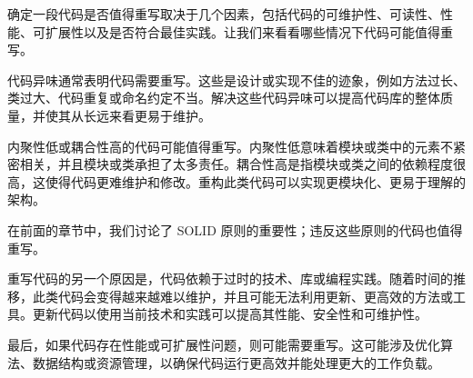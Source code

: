 确定一段代码是否值得重写取决于几个因素，包括代码的可维护性、可读性、性能、可扩展性以及是否符合最佳实践。让我们来看看哪些情况下代码可能值得重写。

代码异味通常表明代码需要重写。这些是设计或实现不佳的迹象，例如方法过长、类过大、代码重复或命名约定不当。解决这些代码异味可以提高代码库的整体质量，并使其从长远来看更易于维护。

内聚性低或耦合性高的代码可能值得重写。内聚性低意味着模块或类中的元素不紧密相关，并且模块或类承担了太多责任。耦合性高是指模块或类之间的依赖程度很高，这使得代码更难维护和修改。重构此类代码可以实现更模块化、更易于理解的架构。

在前面的章节中，我们讨论了 SOLID 原则的重要性；违反这些原则的代码也值得重写。

重写代码的另一个原因是，代码依赖于过时的技术、库或编程实践。随着时间的推移，此类代码会变得越来越难以维护，并且可能无法利用更新、更高效的方法或工具。更新代码以使用当前技术和实践可以提高其性能、安全性和可维护性。

最后，如果代码存在性能或可扩展性问题，则可能需要重写。这可能涉及优化算法、数据结构或资源管理，以确保代码运行更高效并能处理更大的工作负载。